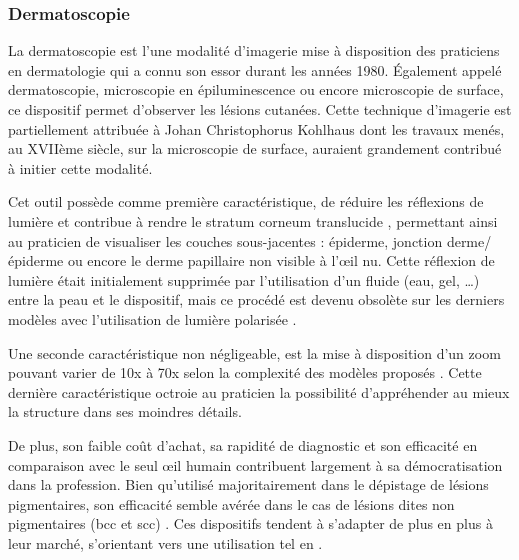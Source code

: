 \subsubsection{Dermatoscopie}
La dermatoscopie est l'une modalité d’imagerie mise à disposition des praticiens en dermatologie qui a connu son essor durant les années 1980. Également appelé dermatoscopie, microscopie en épiluminescence ou encore microscopie de surface, ce dispositif permet d’observer les lésions cutanées. Cette technique d’imagerie est partiellement attribuée à Johan Christophorus Kohlhaus dont les travaux menés, au XVIIème siècle, sur la microscopie de surface, auraient grandement contribué à initier cette modalité.\par
Cet outil possède comme première caractéristique, de réduire les réflexions de lumière et contribue à rendre le stratum corneum translucide \cite{Katz2001}, permettant ainsi au praticien de visualiser les couches sous-jacentes : épiderme, jonction derme/épiderme ou encore le derme papillaire non visible à l’œil nu. Cette réflexion de lumière était initialement supprimée par l’utilisation d’un fluide (eau, gel, …) entre la peau et le dispositif, mais ce procédé est devenu obsolète sur les derniers modèles avec l’utilisation de lumière  polarisée \cite{Campos-do-Carmo2008}.\par
Une seconde caractéristique non négligeable, est la mise à disposition d’un zoom pouvant varier de 10x à 70x selon la complexité des modèles proposés \cite{Campos-do-Carmo2008}. Cette dernière caractéristique octroie au praticien la possibilité d’appréhender au mieux la structure dans ses moindres détails.\par
De plus, son faible coût d’achat, sa rapidité de diagnostic et son efficacité en comparaison avec le seul œil humain \cite{Lallas2013} contribuent largement  à sa démocratisation dans la profession. Bien qu’utilisé majoritairement dans le dépistage de lésions pigmentaires, son efficacité semble avérée dans le cas de lésions dites non pigmentaires (\gls{bcc} et \gls{scc}) \cite{Lallas2013}. Ces dispositifs tendent à s'adapter de plus en plus à leur marché, s'orientant vers une utilisation tel en .\par
